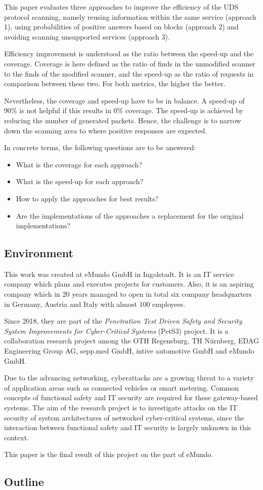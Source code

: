 This paper evaluates three approaches to improve the efficiency of the UDS protocol scanning, namely reusing information within the same service (approach 1), using probabilities of positive answers based on blocks (approach 2) and avoiding scanning unsupported services (approach 3).

Efficiency improvement is understood as the ratio between the speed-up and the coverage. Coverage is here defined as the ratio of finds in the unmodified scanner to the finds of the modified scanner, and the speed-up as the ratio of requests in comparison between these two. For both metrics, the higher the better.

Nevertheless, the coverage and speed-up have to be in balance. A speed-up of 90\% is not helpful if this results in 0\% coverage. The speed-up is achieved by reducing the number of generated packets. Hence, the challenge is to narrow down the scanning area to where positive responses are expected.

In concrete terms, the following questions are to be answered:

\begin{itemize}
    \item What is the coverage for each approach?
    \item What is the speed-up for each approach?
    \item How to apply the approaches for best results?
    \item Are the implementations of the approaches a replacement for the original implementations?
\end{itemize}


\subsection{Environment}
This work was created at eMundo GmbH in Ingolstadt. It is an IT service company which plans and executes projects for customers. Also, it is an aspiring company which in 20 years managed to open in total six company headquarters in Germany, Austria and Italy with almost 100 employees.

Since 2018, they are part of the \emph{Penetration Test Driven Safety and Security System Improvements for Cyber-Critical Systems} (PetS3) project. It is a collaboration research project among the OTH Regensburg, TH Nürnberg, EDAG Engineering Group AG, sepp.med GmbH, intive automotive GmbH and eMundo GmbH.

Due to the advancing networking, cyberattacks are a growing threat to a variety of application areas such as connected vehicles or smart metering. Common concepts of functional safety and IT security are required for these gateway-based systems. The aim of the research project is to investigate attacks on the IT security of system architectures of networked cyber-critical systems, since the interaction between functional safety and IT security is largely unknown in this context.

This paper is the final result of this project on the part of eMundo.

\subsection{Outline}
